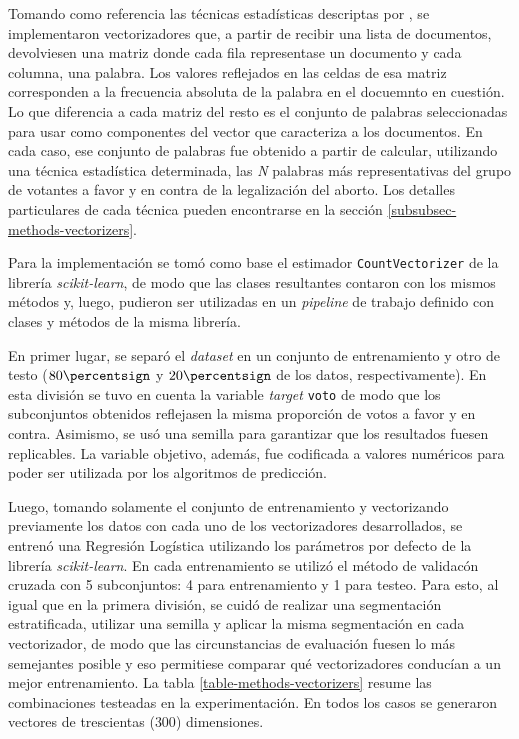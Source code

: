 Tomando como referencia las técnicas estadísticas descriptas por
\cite{monroe2008fightin}, se implementaron vectorizadores que, a partir de
recibir una lista de documentos, devolviesen una matriz donde cada fila
representase un documento y cada columna, una palabra. Los valores
reflejados en las celdas de esa matriz corresponden a la frecuencia absoluta
de la palabra en el docuemnto en cuestión. Lo que diferencia a cada matriz del resto
es el conjunto de palabras seleccionadas para usar como componentes del vector
que caracteriza a los documentos. En cada caso, ese conjunto de palabras
fue obtenido a partir de calcular, utilizando una técnica estadística determinada,
las \textit{N} palabras más representativas del grupo de votantes a favor y
en contra de la legalización del aborto. Los detalles particulares de cada
técnica pueden encontrarse en la sección \ref{subsubsec-methods-vectorizers}.
\par
Para la implementación se tomó como base el estimador \texttt{CountVectorizer}
de la librería \textit{scikit-learn}, de modo que las clases resultantes contaron
con los mismos métodos y, luego, pudieron ser utilizadas en un \textit{pipeline}
de trabajo definido con clases y métodos de la misma librería.
\par
En primer lugar, se separó el \textit{dataset} en un conjunto de entrenamiento
y otro de testo ($80\percentsign$ y $20\percentsign$ de los datos, respectivamente).
En esta división se tuvo en cuenta la variable \textit{target} \texttt{voto} de modo
que los subconjuntos obtenidos reflejasen la misma proporción de votos a favor
y en contra. Asimismo, se usó una semilla para garantizar que los resultados
fuesen replicables. La variable objetivo, además, fue codificada a valores
numéricos para poder ser utilizada por los algoritmos de predicción.
\par
Luego, tomando solamente el conjunto de entrenamiento y vectorizando
previamente los datos con cada uno de los vectorizadores desarrollados,
se entrenó una Regresión Logística utilizando los parámetros por defecto
de la librería \textit{scikit-learn}. En cada entrenamiento se utilizó el método
de validacón cruzada con 5 subconjuntos: 4 para entrenamiento y 1 para testeo.
Para esto, al igual que en la primera división, se cuidó de realizar
una segmentación estratificada, utilizar una semilla y
aplicar la misma segmentación en cada vectorizador,
de modo que las circunstancias de evaluación fuesen lo más semejantes posible
y eso permitiese comparar qué vectorizadores conducían a un mejor entrenamiento.
La tabla \ref{table-methods-vectorizers} resume las combinaciones testeadas
en la experimentación. En todos los casos se generaron vectores de trescientas
($300$) dimensiones.

